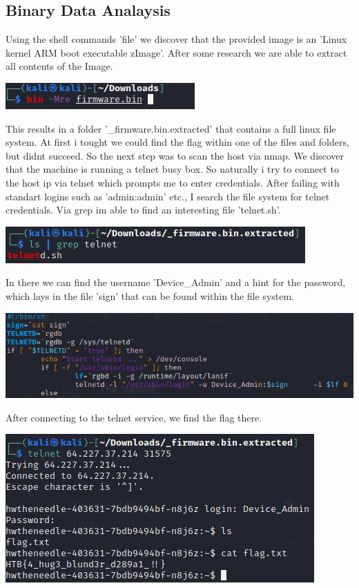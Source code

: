 \documentclass[a4paper,10pt]{article}
\begin{document}
\subsection{Binary Data Analaysis}
Using the shell commands 'file' we discover that the provided image is an 'Linux kernel ARM boot executable zImage'. After some research we are able to extract all contents of the Image.
\begin{center}
\includegraphics[scale=0.6]{binwalk.png}
\end{center}
This results in a folder '\_firmware.bin.extracted\/' that contains a full linux file system. At first i tought we could find the flag within one of the files and folders, but didnt succeed.
So the next step was to scan the host via nmap. We discover that the machine is running a telnet busy box. So naturally i try to connect to the host ip via telnet which prompts me to enter credentials. After failing with standart logins such as 'admin:admin' etc.,  I search the file system for telnet credentials. Via grep im able to find an interesting file 'telnet.sh'.
\begin{center}
\includegraphics[scale=0.5]{telnet.png}
\end{center}
In there we can find the username 'Device\_Admin' and a hint for the password, which lays in the file 'sign' that can be found within the file system.
\begin{center}
\includegraphics[scale=0.5]{telnetf.png} 
\end{center}
\newpage
After connecting to the telnet service, we find the flag there.
\begin{center}
 \includegraphics[scale=0.5]{flag.png}
\end{center}
\end{document}
